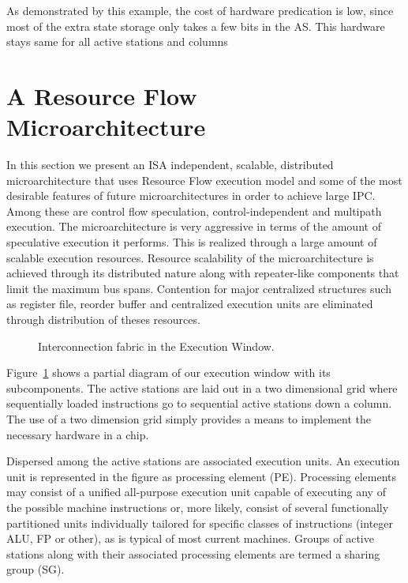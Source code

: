 \documentclass[10pt,twocolumn]{IEEEtran}
\begin{document}
As demonstrated by this example, the cost of hardware predication is
low, since most of the extra state storage only takes a few bits in the
AS.  This hardware stays same for all active stations and columns

\section {A Resource Flow Microarchitecture}

In this section we present an ISA independent, scalable, distributed
microarchitecture that uses Resource Flow execution model and some of
the most desirable features of future microarchitectures in order to
achieve large IPC.  Among these are control flow speculation,
control-independent and multipath execution.  The microarchitecture is
very aggressive in terms of the amount of speculative execution it
performs.  This is realized through a large amount of scalable
execution resources.  Resource scalability of the microarchitecture is
achieved through its distributed nature along with repeater-like
components that limit the maximum bus spans.  Contention for major
centralized structures such as register file, reorder buffer and
centralized execution units are eliminated through distribution of
theses resources.

\begin{figure}
{}
\caption{Interconnection fabric in the Execution Window.}
\label{fig:execwind}
\end{figure}  

Figure~\ref{fig:execwind} shows a partial diagram of our execution
window with its subcomponents.  The active stations are laid out in a
two dimensional grid where sequentially loaded instructions go to
sequential active stations down a column.  The use of a two dimension
grid simply provides a means to implement the necessary hardware in a
chip.


Dispersed among the active stations are associated execution units.  An
execution unit is represented in the figure as processing element
(PE).  Processing elements may consist of a unified all-purpose
execution unit capable of executing any of the possible machine
instructions or, more likely, consist of several functionally
partitioned units individually tailored for specific classes of
instructions (integer ALU, FP or other), as is typical of most current
machines.  Groups of active stations along with their associated
processing elements are termed a sharing group (SG).
\end{document}
